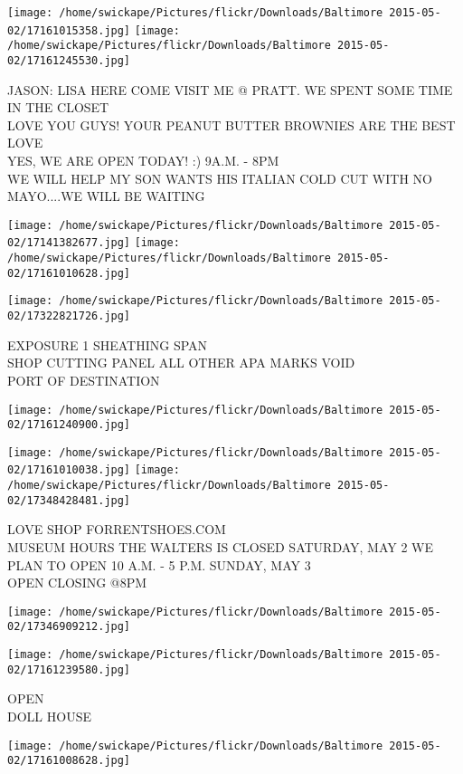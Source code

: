 \documentclass[10pt,letterpaper]{article}
\begin{document}
\texttt{[image: /home/swickape/Pictures/flickr/Downloads/Baltimore 2015-05-02/17161015358.jpg]}
\texttt{[image: /home/swickape/Pictures/flickr/Downloads/Baltimore 2015-05-02/17161245530.jpg]}

JASON: LISA HERE COME VISIT ME @ PRATT.  WE SPENT SOME TIME IN THE CLOSET\\
LOVE YOU GUYS!  YOUR PEANUT BUTTER BROWNIES ARE THE BEST LOVE\\
YES, WE ARE OPEN TODAY! :)  9A.M. {-} 8PM\\
WE WILL HELP MY SON WANTS HIS ITALIAN COLD CUT WITH NO MAYO....WE WILL BE WAITING
\pagebreak

\texttt{[image: /home/swickape/Pictures/flickr/Downloads/Baltimore 2015-05-02/17141382677.jpg]}
\texttt{[image: /home/swickape/Pictures/flickr/Downloads/Baltimore 2015-05-02/17161010628.jpg]}

\texttt{[image: /home/swickape/Pictures/flickr/Downloads/Baltimore 2015-05-02/17322821726.jpg]}

EXPOSURE 1 SHEATHING SPAN\\
SHOP CUTTING PANEL ALL OTHER APA MARKS VOID\\
PORT OF DESTINATION
\pagebreak

\texttt{[image: /home/swickape/Pictures/flickr/Downloads/Baltimore 2015-05-02/17161240900.jpg]}

\vspace{0.25in}
\texttt{[image: /home/swickape/Pictures/flickr/Downloads/Baltimore 2015-05-02/17161010038.jpg]}
\texttt{[image: /home/swickape/Pictures/flickr/Downloads/Baltimore 2015-05-02/17348428481.jpg]}

LOVE SHOP FORRENTSHOES.COM\\
MUSEUM HOURS THE WALTERS IS CLOSED SATURDAY, MAY 2 WE PLAN TO OPEN 10 A.M. {-} 5 P.M. SUNDAY, MAY 3\\
OPEN CLOSING @8PM
\pagebreak

\texttt{[image: /home/swickape/Pictures/flickr/Downloads/Baltimore 2015-05-02/17346909212.jpg]}

\vspace{0.25in}
\texttt{[image: /home/swickape/Pictures/flickr/Downloads/Baltimore 2015-05-02/17161239580.jpg]}

OPEN\\
DOLL HOUSE
\pagebreak

\texttt{[image: /home/swickape/Pictures/flickr/Downloads/Baltimore 2015-05-02/17161008628.jpg]}
\end{document}

